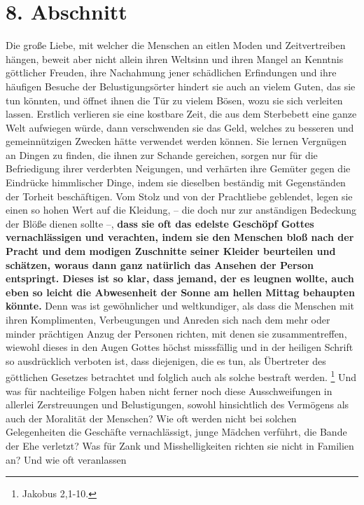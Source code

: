 \section{8. Abschnitt} \label{kap15_ab8}

Die große Liebe, mit welcher die Menschen an eitlen Moden und Zeitvertreiben
hängen, beweit aber nicht allein ihren Weltsinn und ihren Mangel an Kenntnis
göttlicher Freuden, ihre Nachahmung jener schädlichen Erfindungen und ihre
häufigen Besuche der Belustigungsörter hindert sie auch an vielem Guten, das
sie tun könnten, und öffnet ihnen die Tür zu vielem Bösen, wozu sie sich
verleiten lassen. Erstlich verlieren sie eine kostbare Zeit, die aus dem
Sterbebett eine ganze Welt aufwiegen würde, dann verschwenden sie das Geld,
welches zu besseren und gemeinnützigen Zwecken hätte verwendet werden können.
Sie lernen Vergnügen an Dingen zu finden, die ihnen zur Schande gereichen, sorgen
nur für die Befriedigung ihrer verderbten Neigungen, und verhärten ihre Gemüter
gegen die Eindrücke himmlischer Dinge, indem sie dieselben beständig mit
Gegenständen der Torheit beschäftigen. Vom Stolz und von der Prachtliebe
geblendet, legen sie einen so hohen Wert auf die Kleidung, -- die doch nur zur
anständigen Bedeckung der Blöße dienen sollte --, \textbf{dass sie oft das edelste
Geschöpf Gottes vernachlässigen und verachten, indem sie den Menschen bloß nach
der Pracht und dem modigen Zuschnitte seiner Kleider beurteilen und schätzen,
woraus dann ganz natürlich das Ansehen der Person entspringt. Dieses ist so
klar, dass jemand, der es leugnen wollte, auch eben so leicht die Abwesenheit der
Sonne am hellen Mittag behaupten könnte.} Denn was ist gewöhnlicher und
weltkundiger, als dass die Menschen mit ihren Komplimenten, Verbeugungen und
Anreden sich nach dem mehr oder minder prächtigen Anzug der Personen richten,
mit denen sie zusammentreffen, wiewohl dieses in den Augen Gottes höchst
misssfällig und in der heiligen Schrift so ausdrücklich verboten ist, dass
diejenigen, die es tun, als Übertreter des göttlichen Gesetzes betrachtet und
folglich auch als solche bestraft werden.
\footnote{Jakobus 2,1-10.}
Und was für nachteilige
Folgen haben nicht ferner noch diese Ausschweifungen in allerlei Zerstreuungen
und Belustigungen, sowohl hinsichtlich des Vermögens als auch der Moralität der
Menschen? Wie oft werden nicht bei solchen Gelegenheiten die Geschäfte
vernachlässigt, junge Mädchen verführt, die Bande der Ehe verletzt? Was für Zank
und Misshelligkeiten richten sie nicht in Familien an? Und wie oft veranlassen
